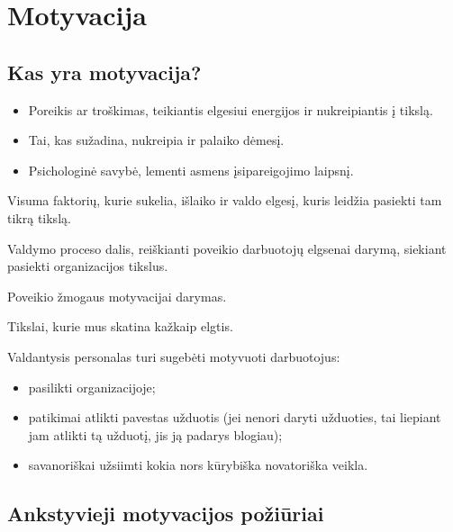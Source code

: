 \chapter{Motyvacija}

\section{Kas yra motyvacija?}

\begin{defn}[Motyvacija]
  \begin{itemize}
    \item Poreikis ar troškimas, teikiantis elgesiui energijos ir
      nukreipiantis į tikslą.
    \item Tai, kas sužadina, nukreipia ir palaiko dėmesį.
    \item Psichologinė savybė, lementi asmens įsipareigojimo laipsnį.
  \end{itemize}
\end{defn}

\begin{defn}[Motyvacija]
  Visuma faktorių, kurie sukelia, išlaiko ir valdo elgesį, kuris leidžia
  pasiekti tam tikrą tikslą.
\end{defn}

\begin{defn}[Motyvavimas]
  Valdymo proceso dalis, reiškianti poveikio darbuotojų elgsenai darymą,
  siekiant pasiekti organizacijos tikslus.
\end{defn}

\begin{defn}[Motyvavimas]
  Poveikio žmogaus motyvacijai darymas.
\end{defn}

\begin{defn}[Motyvai]
  Tikslai, kurie mus skatina kažkaip elgtis.
\end{defn}

Valdantysis personalas turi sugebėti motyvuoti darbuotojus:
\begin{itemize}
  \item pasilikti organizacijoje;
  \item patikimai atlikti pavestas užduotis (jei nenori daryti užduoties,
    tai liepiant jam atlikti tą užduotį, jis ją padarys blogiau);
  \item savanoriškai užsiimti kokia nors kūrybiška novatoriška veikla.
\end{itemize}

\section{Ankstyvieji motyvacijos požiūriai}

